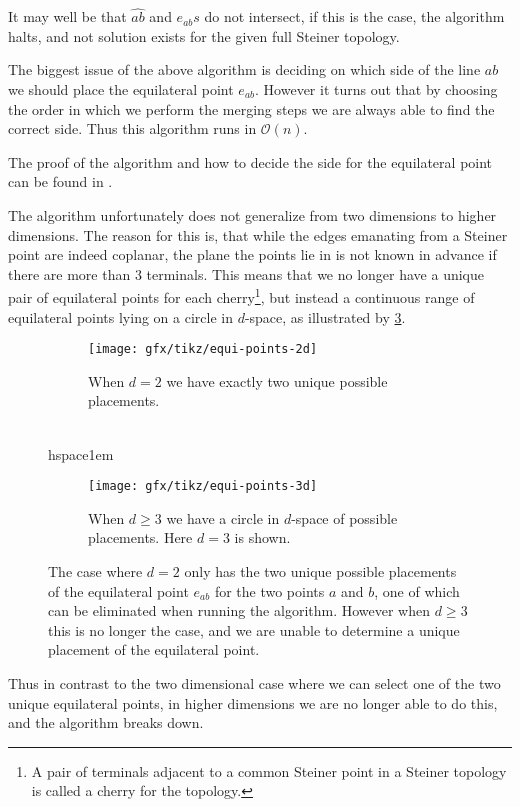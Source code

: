 It may well be that $\widehat{ab}$ and $e_{ab}s$ do not intersect, if this is
the case, the algorithm halts, and not solution exists for the given full
Steiner topology.

The biggest issue of the above algorithm is deciding on which side of the line
$ab$ we should place the equilateral point $e_{ab}$. However it turns out that
by choosing the order in which we perform the merging steps we are always able
to find the correct side. Thus this algorithm runs in $\mathcal{O}(n)$.


The proof of the algorithm and how to decide the side for the equilateral point
can be found in \textcite[ch.~1]{brazil2015}.

The algorithm unfortunately does not generalize from two dimensions to higher
dimensions. The reason for this is, that while the edges emanating from a
Steiner point are indeed coplanar, the plane the points lie in is not known in
advance if there are more than $3$ terminals. This means that we no longer have
a unique pair of equilateral points for each cherry\footnote{A pair of terminals
  adjacent to a common Steiner point in a Steiner topology is called a cherry
  for the topology.}, but instead a continuous range of equilateral points lying
on a circle in $d$-space, as illustrated by \cref{fig:equi-points}.
%
\begin{figure}[htbp]
  \centering
  \begin{subfigure}[t]{0.4\textwidth}
    \texttt{[image: gfx/tikz/equi-points-2d]}
    \caption{When $d = 2$ we have exactly two unique possible
      placements.\label{fig:equi-points-2d}}
  \end{subfigure}\\hspace{1em}%
  \begin{subfigure}[t]{0.4\textwidth}
    \texttt{[image: gfx/tikz/equi-points-3d]}
    \caption{When $d \ge 3$ we have a circle in $d$-space of possible
      placements. Here $d = 3$ is shown.\label{fig:equi-points-3d}}
  \end{subfigure}
  \caption[Equilateral points in 2D and $d$-space]{The case where $d = 2$ only
    has the two unique possible placements of the equilateral point $e_{ab}$ for the
    two points $a$ and $b$, one of which can be eliminated when running the
    algorithm. However when $d \ge 3$ this is no longer the case, and we are
    unable to determine a unique placement of the equilateral
    point.\label{fig:equi-points}}
\end{figure}
%
Thus in contrast to the two dimensional case where we can select one of the two
unique equilateral points, in higher dimensions we are no longer able to do
this, and the algorithm breaks down.

